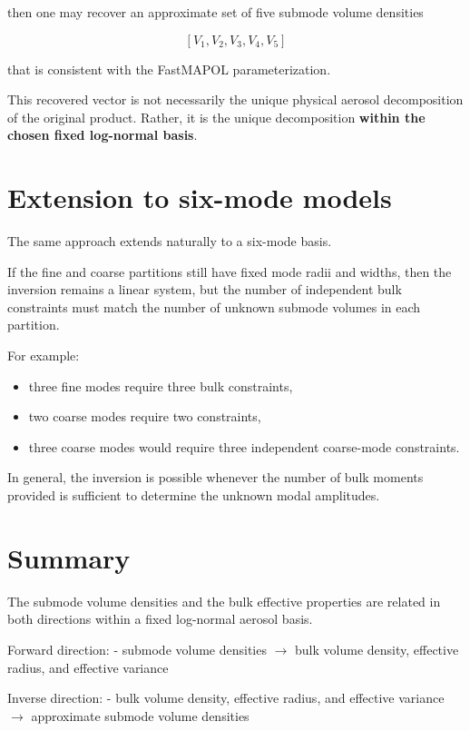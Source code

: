 \documentclass[
  letterpaper,
]{scrbook}
\providecommand{\tightlist}{%
  \setlength{\itemsep}{0pt}\setlength{\parskip}{0pt}}
\begin{document}
then one may recover an approximate set of five submode volume densities

\[
[V_1,V_2,V_3,V_4,V_5]
\]

that is consistent with the FastMAPOL parameterization.

This recovered vector is not necessarily the unique physical aerosol
decomposition of the original product. Rather, it is the unique
decomposition \textbf{within the chosen fixed log-normal basis}.

\section{Extension to six-mode
models}\label{extension-to-six-mode-models}

The same approach extends naturally to a six-mode basis.

If the fine and coarse partitions still have fixed mode radii and
widths, then the inversion remains a linear system, but the number of
independent bulk constraints must match the number of unknown submode
volumes in each partition.

For example:

\begin{itemize}
\tightlist
\item
  three fine modes require three bulk constraints,
\item
  two coarse modes require two constraints,
\item
  three coarse modes would require three independent coarse-mode
  constraints.
\end{itemize}

In general, the inversion is possible whenever the number of bulk
moments provided is sufficient to determine the unknown modal
amplitudes.

\section{Summary}\label{summary-3}

The submode volume densities and the bulk effective properties are
related in both directions within a fixed log-normal aerosol basis.

Forward direction: - submode volume densities \(\rightarrow\) bulk
volume density, effective radius, and effective variance

Inverse direction: - bulk volume density, effective radius, and
effective variance \(\rightarrow\) approximate submode volume densities
\end{document}
